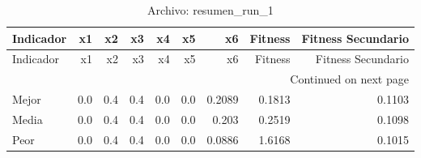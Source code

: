 \begin{longtable}{lrrrrrrrr}
\caption{Archivo: resumen\_run\_1}\label{tab:resumen_run_1} \\
\toprule
Indicador & x1 & x2 & x3 & x4 & x5 & x6 & Fitness & Fitness Secundario \\
\midrule
\endfirsthead
\toprule
Indicador & x1 & x2 & x3 & x4 & x5 & x6 & Fitness & Fitness Secundario \\
\midrule
\endhead
\midrule
\multicolumn{9}{r}{Continued on next page} \\
\midrule
\endfoot
\bottomrule
\endlastfoot
Mejor & 0.0 & 0.4 & 0.4 & 0.0 & 0.0 & 0.2089 & 0.1813 & 0.1103 \\
Media & 0.0 & 0.4 & 0.4 & 0.0 & 0.0 & 0.203 & 0.2519 & 0.1098 \\
Peor & 0.0 & 0.4 & 0.4 & 0.0 & 0.0 & 0.0886 & 1.6168 & 0.1015 \\
\end{longtable}